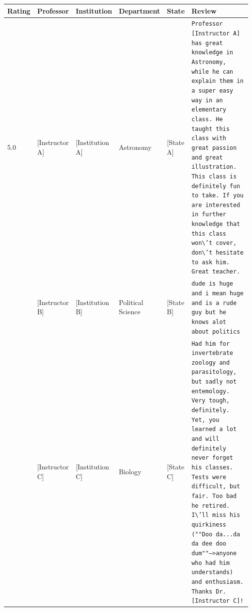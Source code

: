 \documentclass{article}
\begin{document}
\thispagestyle{empty}
\vspace{0.5em}
\noindent
\begin{tabular}{p{2cm} p{3cm} p{2.5cm} p{2cm} p{1.5cm} p{6.25cm}}
\toprule
\textbf{Rating} & \textbf{Professor} & \textbf{Institution} & \textbf{Department} & \textbf{State} & \textbf{Review} \\
\midrule
5.0 & [Instructor A] & [Institution A] & Astronomy & [State A] & \texttt{Professor [Instructor A] has great knowledge in Astronomy, while he can explain them in a super easy way in an elementary class. He taught this class with great passion and great illustration. This class is definitely fun to take. If you are interested in further knowledge that this class won\textbackslash't cover, don\textbackslash't hesitate to ask him. Great teacher.} \\
\addlinespace
\addlinespace
3.0 & [Instructor B] & [Institution B] & Political Science & [State B] & \texttt{dude is huge and i mean huge and is a rude guy but he knows alot about politics} \\
\addlinespace
\addlinespace
5.0 & [Instructor C] & [Institution C] & Biology & [State C] & \texttt{Had him for invertebrate zoology and parasitology, but sadly not entemology. Very tough, definitely. Yet, you learned a lot and will definitely never forget his classes. Tests were difficult, but fair. Too bad he retired. I\textbackslash'll miss his quirkiness (""Doo da...da da dee doo dum""-->anyone who had him understands) and enthusiasm. Thanks Dr. [Instructor C]!} \\

\bottomrule
\end{tabular}
\end{document}
